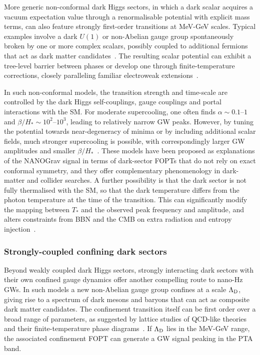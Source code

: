 \documentclass[a4paper,11pt]{article}
\begin{document}
More generic non-conformal dark Higgs sectors, in which a dark scalar acquires a vacuum expectation value through 
a renormalisable potential with explicit mass terms, can also feature strongly first-order transitions at MeV-GeV scales.
Typical examples involve a dark $U(1)$ or non-Abelian gauge group spontaneously broken by one or more complex scalars, 
possibly coupled to additional fermions that act as dark matter candidates~\citep{Nakai:2020oit,Bringmann:2020ura,
Addazi:2020DarkPT}. The resulting scalar potential can exhibit a tree-level barrier between phases or develop 
one through finite-temperature corrections, closely paralleling familiar electroweak extensions~\citep{Profumo:2007wc,Espinosa:2011ax,Caprini:2015zlo}.

In such non-conformal models, the transition strength and time-scale are controlled by the dark Higgs self-couplings, gauge
couplings and portal interactions with the SM. For moderate supercooling, one often finds $\alpha \sim 0.1$--$1$ and
$\beta/H_*\sim 10^2$--$10^3$, leading to relatively narrow GW peaks. However, by tuning the potential towards 
near-degeneracy of minima or by including additional scalar fields, much stronger supercooling is possible, with 
correspondingly larger GW amplitudes and smaller $\beta/H_*$~\citep{Schwaller:2015tja,Addazi:2020DarkPT}. 
These models have been proposed as explanations of the NANOGrav signal in terms of dark-sector FOPTs that 
do not rely on exact conformal symmetry, and they offer complementary phenomenology in dark-matter and collider
searches.
A further possibility is that the dark sector is not fully thermalised with the SM, so that the dark temperature differs 
from the photon temperature at the time of the transition. This can significantly modify the mapping between $T_*$ and 
the observed peak frequency and amplitude, and alters constraints from BBN and the CMB on extra radiation and entropy
injection~\citep{Cruz:2023HotNEDE,Bringmann:2020ura}. 

\subsubsection{Strongly-coupled confining dark sectors}
\label{sec:composite-dark}

Beyond weakly coupled dark Higgs sectors, strongly interacting dark sectors with their own confined gauge dynamics offer 
another compelling route to nano-Hz GWs. In such models a new non-Abelian gauge group confines at a scale $\Lambda_{\rm D}$,
giving rise to a spectrum of dark mesons and baryons that can act as composite dark matter candidates. The confinement
transition itself can be first order over a broad range of parameters, as suggested by lattice studies of QCD-like theories 
and their finite-temperature phase diagrams~\citep{Aoki:2006we,Borsanyi:2010bp}. If $\Lambda_{\rm D}$ lies in the MeV-GeV range, the associated confinement FOPT 
can generate a GW signal peaking in the PTA band.
\end{document}
